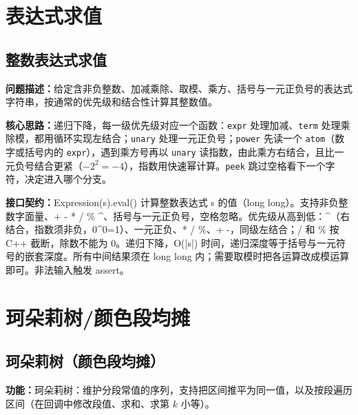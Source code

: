 \Needspace{180pt}

\chapter{表达式求值}

\section{整数表达式求值}\label{compact-Expression}

\noindent\textbf{问题描述：}\allowbreak 给定含非负整数、加减乘除、取模、乘方、括号与一元正负号的表达式字符串，按通常的优先级和结合性计算其整数值。

\textbf{核心思路：}\allowbreak 递归下降，每一级优先级对应一个函数：\texttt{expr} 处理加减、\texttt{term} 处理乘除模，都用循环实现左结合；\texttt{unary} 处理一元正负号；\texttt{power} 先读一个 \texttt{atom}（数字或括号内的 \texttt{expr}），遇到乘方号再以 \texttt{unary} 读指数，由此乘方右结合，且比一元负号结合更紧（$-2^2=-4$），指数用快速幂计算。\texttt{peek} 跳过空格看下一个字符，决定进入哪个分支。



{\sloppy{}\noindent\textbf{接口契约：}Expression(s).eval() 计算整数表达式 s 的值（long long）。支持非负整数字面量、+ - * / \% \textasciicircum{}、括号与一元正负号，空格忽略。优先级从高到低：\textasciicircum{}（右结合，指数须非负，0\textasciicircum{}0=1）、一元正负、* / \%、+ -，同级左结合；/ 和 \% 按 C++ 截断，除数不能为 0。递归下降，O(|s|) 时间，递归深度等于括号与一元符号的嵌套深度。所有中间结果须在 long long 内；需要取模时把各运算改成模运算即可。非法输入触发 assert。\par}



\Needspace{606pt}

\chapter{珂朵莉树/颜色段均摊}

\section{珂朵莉树（颜色段均摊）}\label{compact-ODT}

\noindent\textbf{功能：}\allowbreak 珂朵莉树：维护分段常值的序列，支持把区间推平为同一值，以及按段遍历区间（在回调中修改段值、求和、求第 $k$ 小等）。

